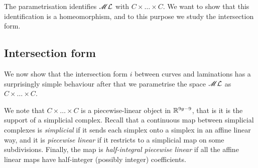 The parametrisation identifies $\mathscr{M}\mathcal{L}$ with  $C\times \ldots \times C$. We want to show that this identification is a homeomorphism, and to this purpose we study the intersection form.

\subsection{Intersection form}
We now show that the intersection form $i$ between curves and laminations has a surprisingly simple behaviour after that we parametrise the space $\mathscr{M}\mathcal{L}$ as $C\times \ldots \times C$. 

We note that $C\times \ldots \times C$ is a piecewise-linear object in $\mathbb{R}^{9g-9}$, that is it is the support of a simplicial complex. Recall that a continuous map between simplicial complexes is \emph{simplicial} if it sends each simplex onto a simplex in an affine linear way, and it is \emph{piecewise linear} if it restricts to a simplicial map on some subdivisions. Finally, the map is \emph{half-integral piecewise linear} if all the affine linear maps have half-integer (possibly integer) coefficients.

